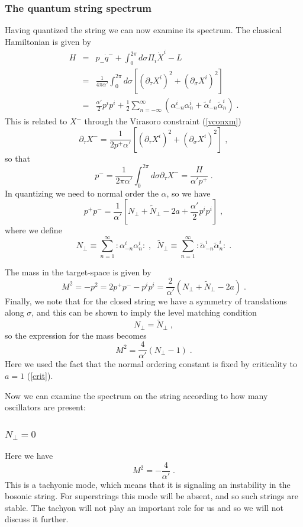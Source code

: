 \documentclass[11pt,a4paper]{article}
\numberwithin{equation}{section}
\numberwithin{table}{section}\setlength{\multlinegap}{25pt}
\newcommand{\bea}{\begin{eqnarray}}  \newcommand{\eea}{\end{eqnarray}}
\newcommand{\nn}{\nonumber}
\newcommand{\be}{\begin{equation}}
\newcommand{\ee}{\end{equation}}
\begin{document}
\subsubsection{The quantum string spectrum}

Having quantized the string we can now examine its spectrum. The classical Hamiltonian is given by
\bea
H &=& p_- \dot q^- + \int_0^{2\pi} d\sigma \Pi_i \dot X^i - L \nn \\
 &=& \frac{1}{4\pi\alpha'}\int_0^{2\pi} d\sigma \left[ \left( \partial_{\tau}X^i\right)^2 + \left( \partial_{\sigma}X^i\right)^2 \right] \nn \\
 & =& \frac{\alpha'}{2} p^i p^i + \frac12 \sum_{n=-\infty}^{\infty} \left( \alpha^i_{-n} \alpha^i_n + \tilde{\alpha}^i_{-n} \tilde{\alpha}^i_n\right) \;.
\label{hami}
\eea
This is related to $X^-$ through the Virasoro constraint (\ref{vconxm}) 
\be
\partial_{\tau} X^- = \frac{1}{2p^+\alpha'}\left[ \left( \partial_{\tau}X^i\right)^2 + \left( \partial_{\sigma}X^i\right)^2 \right] \;,
\ee
so that
\be
p^- = \frac{1}{2\pi\alpha'} \int_0^{2\pi} d\sigma \partial_{\tau}X^- = \frac{H}{\alpha' p^+} \;.
\label{pppmma}
\ee
In quantizing we need to normal order the $\alpha$, so we have 
\be
p^+ p^- = \frac{1}{\alpha'} \left[ N_{\perp} + \tilde{N}_{\perp} - 2a + \frac{\alpha'}{2} p^i p^i\right] \;,
\ee
where we define
\be
N_{\perp} \equiv \sum_{n=1}^{\infty} : \alpha_{-n}^i \alpha_n^i : \;,\;\; \tilde{N}_{\perp} \equiv \sum_{n=1}^{\infty} : \tilde{\alpha}_{-n}^i \tilde{\alpha}_n^i :  \;.
\ee

The mass in the target-space is given by
\be
M^2 = -p^2 = 2 p^+p^- - p^i p^i = \frac{2}{\alpha'} \left( N_{\perp} + \tilde{N}_{\perp} - 2a\right) \;.
\ee
Finally, we note that for the closed string we have a symmetry of translations along $\sigma$, and this can be shown to imply the level matching condition
\be
N_{\perp}  = \tilde{N}_{\perp} \;,
\label{lvlmatch}
\ee
so the expression for the mass becomes
\be
M^2 = \frac{4}{\alpha'} \left( N_{\perp}-1 \right) \;.
\ee
Here we used the fact that the normal ordering constant is fixed by criticality to $a=1$ (\ref{crit}).

Now we can examine the spectrum on the string according to how many oscillators are present:

\subsubsection*{$N_{\perp}=0$}

Here we have
\be
M^2 = -\frac{4}{\alpha'} \;.
\ee
This is a tachyonic mode, which means that it is signaling an instability in the bosonic string. For superstrings this mode will be absent, and so such strings are stable. The tachyon will not play an important role for us and so we will not discuss it further.
\end{document}
